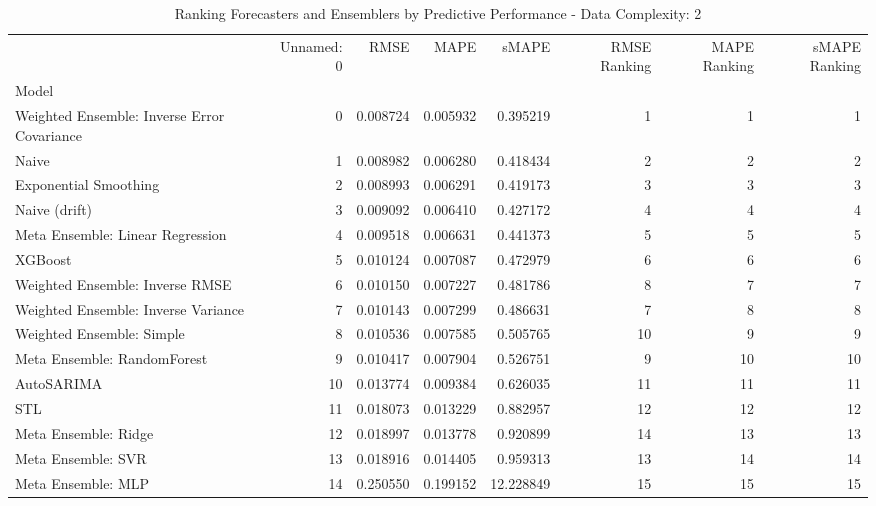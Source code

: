 \begin{table}
\caption{Ranking Forecasters and Ensemblers by Predictive Performance - Data Complexity: 2}
\begin{tabular}{lrrrrrrr}
\toprule
 & Unnamed: 0 & RMSE & MAPE & sMAPE & RMSE Ranking & MAPE Ranking & sMAPE Ranking \\
Model &  &  &  &  &  &  &  \\
\midrule
Weighted Ensemble: Inverse Error Covariance & 0 & 0.008724 & 0.005932 & 0.395219 & 1 & 1 & 1 \\
Naive & 1 & 0.008982 & 0.006280 & 0.418434 & 2 & 2 & 2 \\
Exponential Smoothing & 2 & 0.008993 & 0.006291 & 0.419173 & 3 & 3 & 3 \\
Naive (drift) & 3 & 0.009092 & 0.006410 & 0.427172 & 4 & 4 & 4 \\
Meta Ensemble: Linear Regression & 4 & 0.009518 & 0.006631 & 0.441373 & 5 & 5 & 5 \\
XGBoost & 5 & 0.010124 & 0.007087 & 0.472979 & 6 & 6 & 6 \\
Weighted Ensemble: Inverse RMSE & 6 & 0.010150 & 0.007227 & 0.481786 & 8 & 7 & 7 \\
Weighted Ensemble: Inverse Variance & 7 & 0.010143 & 0.007299 & 0.486631 & 7 & 8 & 8 \\
Weighted Ensemble: Simple & 8 & 0.010536 & 0.007585 & 0.505765 & 10 & 9 & 9 \\
Meta Ensemble: RandomForest & 9 & 0.010417 & 0.007904 & 0.526751 & 9 & 10 & 10 \\
AutoSARIMA & 10 & 0.013774 & 0.009384 & 0.626035 & 11 & 11 & 11 \\
STL & 11 & 0.018073 & 0.013229 & 0.882957 & 12 & 12 & 12 \\
Meta Ensemble: Ridge & 12 & 0.018997 & 0.013778 & 0.920899 & 14 & 13 & 13 \\
Meta Ensemble: SVR & 13 & 0.018916 & 0.014405 & 0.959313 & 13 & 14 & 14 \\
Meta Ensemble: MLP & 14 & 0.250550 & 0.199152 & 12.228849 & 15 & 15 & 15 \\
\bottomrule
\end{tabular}
\end{table}
